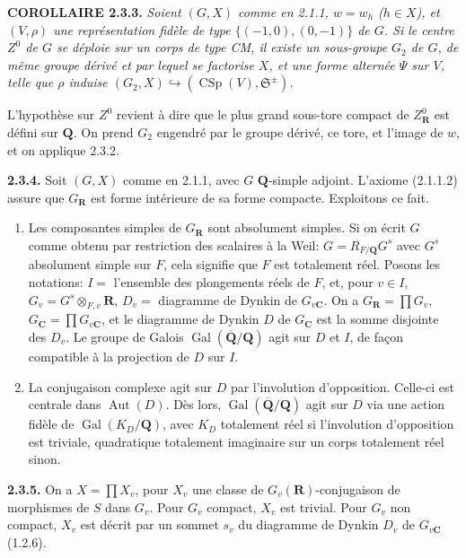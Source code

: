\documentclass[10pt,a4paper]{article}
\begin{document}
\textbf{COROLLAIRE 2.3.3.} \emph{Soient \((G,X)\) comme en 2.1.1, \(w=w_h\) (\(h\in X\)), et \((V,\rho)\) une représentation fidèle de type \(\{(-1,0),(0,-1)\}\) de \(G\). Si le centre \(Z^0\) de \(G\) se déploie sur un corps de type CM, il existe un sous-groupe \(G_2\) de \(G\), de même groupe dérivé et par lequel se factorise \(X\), et une forme alternée \(\Psi\) sur \(V\), telle que \(\rho\) induise \((G_2,X)\hookrightarrow(\operatorname{CSp}(V),\mathfrak S^{\pm})\).}

L'hypothèse sur \(Z^0\) revient à dire que le plus grand sous-tore compact de \(Z_{\mathbf R}^0\) est défini sur \(\mathbf Q\). On prend \(G_2\) engendré par le groupe dérivé, ce tore, et l'image de \(w\), et on applique 2.3.2.

\textbf{2.3.4.} Soit \((G,X)\) comme en 2.1.1, avec \(G\) \(\mathbf Q\)-simple adjoint. L'axiome (2.1.1.2) assure que \(G_{\mathbf R}\) est forme intérieure de sa forme compacte. Exploitons ce fait.

\begin{enumerate}
\def\labelenumi{(\alph{enumi})}
\item
  Les composantes simples de \(G_{\mathbf R}\) sont absolument simples. Si on écrit \(G\) comme obtenu par restriction des scalaires à la Weil: \(G=R_{F/\mathbf Q}G^s\) avec \(G^s\) absolument simple sur \(F\), cela signifie que \(F\) est totalement réel. Posons les notations: \(I=\) l'ensemble des plongements réels de \(F\), et, pour \(v\in I\), \(G_v=G^s\otimes_{F,v}\mathbf R\), \(D_v=\) diagramme de Dynkin de \(G_{v\mathbf C}\). On a \(G_{\mathbf R}=\prod G_v\), \(G_{\mathbf C}=\prod G_{v\mathbf C}\), et le diagramme de Dynkin \(D\) de \(G_{\mathbf C}\) est la somme disjointe des \(D_v\). Le groupe de Galois \(\operatorname{Gal}(\overline{\mathbf Q}/\mathbf Q)\) agit sur \(D\) et \(I\), de façon compatible à la projection de \(D\) sur \(I\).
\item
  La conjugaison complexe agit sur \(D\) par l'involution d'opposition. Celle-ci est centrale dans \(\operatorname{Aut}(D)\). Dès lors, \(\operatorname{Gal}(\overline{\mathbf Q}/\mathbf Q)\) agit sur \(D\) via une action fidèle de \(\operatorname{Gal}(K_D/\mathbf Q)\), avec \(K_D\) totalement réel si l'involution d'opposition est triviale, quadratique totalement imaginaire sur un corps totalement réel sinon.
\end{enumerate}

\textbf{2.3.5.} On a \(X=\prod X_v\), pour \(X_v\) une classe de \(G_v(\mathbf R)\)-conjugaison de morphismes de \(S\) dans \(G_v\). Pour \(G_v\) compact, \(X_v\) est trivial. Pour \(G_v\) non compact, \(X_v\) est décrit par un sommet \(s_v\) du diagramme de Dynkin \(D_v\) de \(G_{v\mathbf C}\) (1.2.6).
\end{document}
